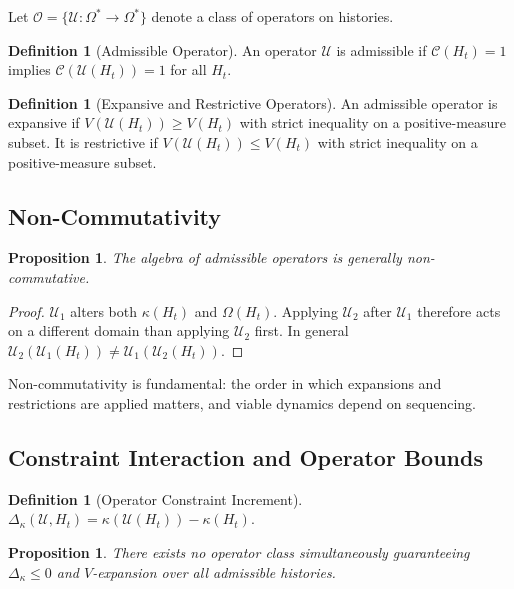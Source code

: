 \documentclass[12pt, a4paper]{article}
\theoremstyle{plain}
\newtheorem{proposition}[theorem]{Proposition}
\theoremstyle{definition}
\newtheorem{definition}[theorem]{Definition}
\theoremstyle{remark}
\begin{document}
Let $\mathcal{O} = \{ \mathcal{U} : \Omega^* \to \Omega^* \}$ denote a class of operators on histories.

\begin{definition}[Admissible Operator]
An operator $\mathcal{U}$ is admissible if $\mathcal{C}(H_t) = 1$ implies $\mathcal{C}(\mathcal{U}(H_t)) = 1$ for all $H_t$.
\end{definition}

\begin{definition}[Expansive and Restrictive Operators]
An admissible operator is expansive if $V(\mathcal{U}(H_t)) \geq V(H_t)$ with strict inequality on a positive-measure subset. It is restrictive if $V(\mathcal{U}(H_t)) \leq V(H_t)$ with strict inequality on a positive-measure subset.
\end{definition}

\subsection{Non-Commutativity}

\begin{proposition}
The algebra of admissible operators is generally non-commutative.
\end{proposition}

\begin{proof}
$\mathcal{U}_1$ alters both $\kappa(H_t)$ and $\Omega(H_t)$. Applying $\mathcal{U}_2$ after $\mathcal{U}_1$ therefore acts on a different domain than applying $\mathcal{U}_2$ first. In general $\mathcal{U}_2(\mathcal{U}_1(H_t)) \neq \mathcal{U}_1(\mathcal{U}_2(H_t))$.
\end{proof}

Non-commutativity is fundamental: the order in which expansions and restrictions are applied matters, and viable dynamics depend on sequencing.

\subsection{Constraint Interaction and Operator Bounds}

\begin{definition}[Operator Constraint Increment]
$\Delta_\kappa(\mathcal{U}, H_t) = \kappa(\mathcal{U}(H_t)) - \kappa(H_t)$.
\end{definition}

\begin{proposition}
There exists no operator class simultaneously guaranteeing $\Delta_\kappa \leq 0$ and $V$-expansion over all admissible histories.
\end{proposition}
\end{document}
